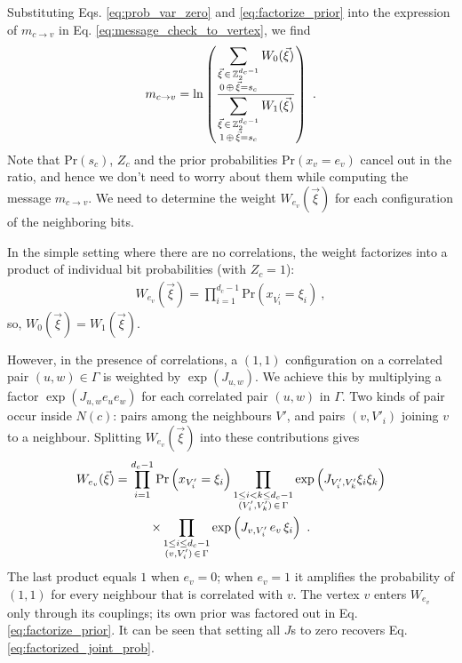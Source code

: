 \documentclass{article}
\def\ts{\thinspace}
\def\P{\text{Pr}}
\begin{document}
Substituting Eqs. \ref{eq:prob_var_zero} and \ref{eq:factorize_prior} into the expression of $m_{c \to v}$ in Eq. \ref{eq:message_check_to_vertex}, we find
\begin{gather}
    m_{c \to v} = \ln\left(\dfrac{\displaystyle\sum_{\substack{\vec{\xi} \ts\in\ts \mathbb{Z}_{2}^{d_{c}-1} \\ 0 \ts\oplus\ts \vec{\xi} = s_c}} W_{0}(\vec{\xi})}{\displaystyle\sum_{\substack{\vec{\xi} \ts\in\ts \mathbb{Z}_{2}^{d_{c}-1} \\ 1 \ts\oplus\ts \vec{\xi} = s_c}} W_{1}(\vec{\xi})}\right) ~. \label{eq:llr_from_probabilities}
\end{gather}
Note that $\P(s_c)$, $Z_{c}$ and the prior probabilities $\P\left(x_{v} = e_{v}\right)$ cancel out in the ratio, and hence we don't need to worry about them while computing the message $m_{c \to v}$. We need to determine the weight $W_{e_v}(\vec{\xi})$ for each configuration of the neighboring bits.

In the simple setting where there are no correlations, the weight factorizes into a product of individual bit probabilities (with $Z_{c} = 1$):
\begin{gather}
    W_{e_v}(\vec{\xi}) = \prod_{i=1}^{d_{c}-1} \P\left(x_{V^{\prime}_{i}} = \xi_{i}\right) ~, \label{eq:factorized_joint_prob}
\end{gather}
so, $W_{0}(\vec{\xi}) = W_{1}(\vec{\xi})$.

However, in the presence of correlations, a $(1,1)$ configuration on a correlated pair $(u, w) \in \Gamma$ is weighted by $\exp\left(J_{u,w}\right)$. We achieve this by multiplying a factor $\exp\left(J_{u,w}e_{u} e_{w}\right)$ for each correlated pair $(u, w)$ in $\Gamma$. Two kinds of pair occur inside $N(c)$: pairs among the neighbours $V'$, and pairs $(v, V'_i)$ joining $v$ to a neighbour. Splitting $W_{e_v}(\vec{\xi})$ into these contributions gives
\begin{multline}
    W_{e_v}(\vec{\xi}) = \prod_{i=1}^{d_{c}-1} \P\left(x_{V^{\prime}_{i}} = \xi_{i}\right) \prod_{\substack{1\leq i<k\leq d_{c}-1 \\ (V^{\prime}_{i}, V^{\prime}_{k}) \ts\in\ts \Gamma}} \exp\left(J_{V^{\prime}_{i},V^{\prime}_{k}} \xi_{i} \xi_{k}\right) \\
    \times \prod_{\substack{1\leq i\leq d_{c}-1 \\ (v, V^{\prime}_{i}) \ts\in\ts \Gamma}} \exp\left(J_{v,V^{\prime}_{i}} \ts e_{v} \ts \xi_{i}\right) ~. \label{eq:correlated_joint_prob}
\end{multline}
The last product equals $1$ when $e_v = 0$; when $e_v = 1$ it amplifies the probability of $(1,1)$ for every neighbour that is correlated with $v$. The vertex $v$ enters $W_{e_v}$ only through its couplings; its own prior was factored out in Eq. \ref{eq:factorize_prior}. It can be seen that setting all $J$s to zero recovers Eq. \ref{eq:factorized_joint_prob}.
\end{document}
